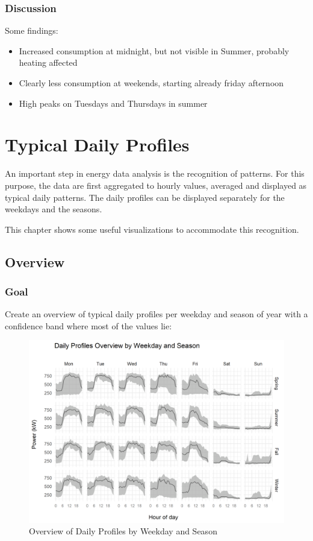 \documentclass[
  a4paperpaper,
]{book}
\begin{document}
\hypertarget{discussion-6}{%
\subsection{Discussion}\label{discussion-6}}

Some findings:

\begin{itemize}
\item
  Increased consumption at midnight, but not visible in Summer, probably heating affected
\item
  Clearly less consumption at weekends, starting already friday afternoon
\item
  High peaks on Tuesdays and Thursdays in summer
\end{itemize}

\hypertarget{typical-daily-profiles}{%
\chapter{Typical Daily Profiles}\label{typical-daily-profiles}}

An important step in energy data analysis is the recognition of patterns. For this purpose, the data are first aggregated to hourly values, averaged and displayed as typical daily patterns. The daily profiles can be displayed separately for the weekdays and the seasons.

This chapter shows some useful visualizations to accommodate this recognition.

\newpage

\hypertarget{overview}{%
\section{Overview}\label{overview}}

\hypertarget{goal-12}{%
\subsection{Goal}\label{goal-12}}

Create an overview of typical daily profiles per weekday and season of year with a confidence band where most of the values lie:

\begin{figure}
\includegraphics[width=0.7\linewidth]{images/plotDailyProfOverview} \caption{Overview of Daily Profiles by Weekday and Season}\label{fig:unnamed-chunk-22}
\end{figure}
\end{document}
